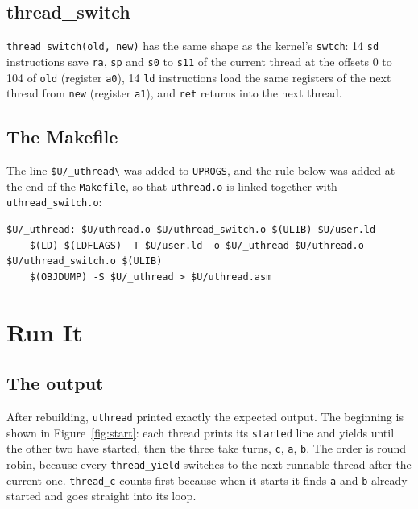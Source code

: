 \documentclass[12pt,a4paper]{article}
\begin{document}
\subsection{thread\_switch}

\texttt{thread\_switch(old, new)} has the same shape as the kernel's \texttt{swtch}: 14 \texttt{sd} instructions save \texttt{ra}, \texttt{sp} and \texttt{s0} to \texttt{s11} of the current thread at the offsets 0 to 104 of \texttt{old} (register \texttt{a0}), 14 \texttt{ld} instructions load the same registers of the next thread from \texttt{new} (register \texttt{a1}), and \texttt{ret} returns into the next thread.



\subsection{The Makefile}

The line \texttt{\$U/\_uthread\textbackslash} was added to \texttt{UPROGS}, and the rule below was added at the end of the \texttt{Makefile}, so that \texttt{uthread.o} is linked together with \texttt{uthread\_switch.o}:

\noindent\begin{minipage}{\linewidth}
\begin{lstlisting}
$U/_uthread: $U/uthread.o $U/uthread_switch.o $(ULIB) $U/user.ld
	$(LD) $(LDFLAGS) -T $U/user.ld -o $U/_uthread $U/uthread.o $U/uthread_switch.o $(ULIB)
	$(OBJDUMP) -S $U/_uthread > $U/uthread.asm
\end{lstlisting}
\end{minipage}

\newpage
\section{Run It}

\subsection{The output}

After rebuilding, \texttt{uthread} printed exactly the expected output. The beginning is shown in Figure~\ref{fig:start}: each thread prints its \texttt{started} line and yields until the other two have started, then the three take turns, \texttt{c}, \texttt{a}, \texttt{b}. The order is round robin, because every \texttt{thread\_yield} switches to the next runnable thread after the current one. \texttt{thread\_c} counts first because when it starts it finds \texttt{a} and \texttt{b} already started and goes straight into its loop.
\end{document}
